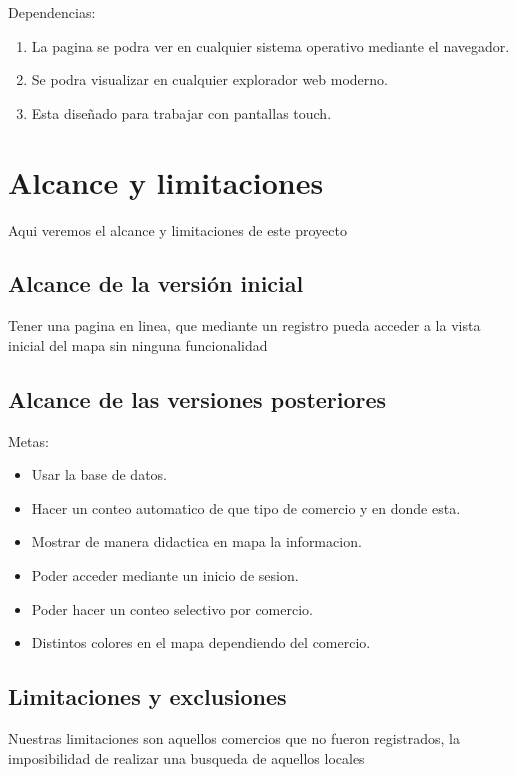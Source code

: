 \documentclass[12pt]{article}
\begin{document}
Dependencias:
\begin{enumerate}
        \item La pagina se podra ver en cualquier sistema operativo mediante el navegador.
        \item Se podra visualizar en cualquier explorador web moderno.
        \item Esta diseñado para trabajar con pantallas touch.
\end{enumerate}

\section{Alcance y limitaciones}

Aqui veremos el alcance y limitaciones de este proyecto
 
\subsection{Alcance de la versión inicial}\label{ant}

Tener una pagina en linea, que mediante un registro pueda acceder a la vista inicial del mapa sin ninguna
funcionalidad

\subsection{Alcance de las versiones posteriores}\label{on}

Metas:
\begin{itemize}

        \item Usar la base de datos.       
        \item Hacer un conteo automatico de que tipo de comercio y en donde esta.
        \item Mostrar de manera didactica en mapa la informacion.
        \item Poder acceder mediante un inicio de sesion.
        \item Poder hacer un conteo selectivo por comercio.
        \item Distintos colores en el mapa dependiendo del comercio.
        
\end{itemize}


\subsection{Limitaciones y exclusiones}\label{occe}

Nuestras limitaciones son aquellos comercios que no fueron registrados, la imposibilidad de realizar una busqueda de aquellos locales 
\end{document}
